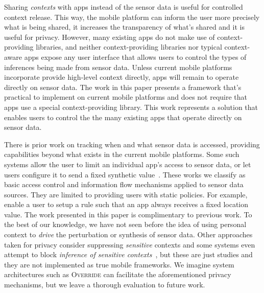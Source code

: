 \documentclass[10pt]{sensys-proc}
\begin{document}
Sharing \emph{contexts} with apps instead of the sensor data is useful for controlled context release. This way, the mobile platform can inform the user more precisely what is being shared, it increases the transparency of what's shared and it is useful for privacy. However, many existing apps do not make use of context-providing libraries, and neither context-providing libraries nor typical context-aware apps expose any user interface that allows users to control the types of inferences being made from sensor data. Unless current mobile platforms incorporate provide high-level context directly, apps will remain to operate directly on sensor data. The work in this paper presents a framework that's practical to implement on current mobile platforms and does not require that apps use a special context-providing library. This work represents a solution that enables users to control the the many existing apps that operate directly on sensor data.

There is prior work on tracking when and what sensor data is accessed, providing capabilities beyond what exists in the current mobile platforms. Some such systems allow the user to limit an individual app's access to sensor data, or let users configure it to send a fixed synthetic value~\cite{Beresford:MockDroid,Enck:TaintDroid}. These works we classify as basic access control and information flow mechanisms applied to sensor data sources. They are limited to providing users with static policies. For example, \cite{Beresford:MockDroid} enable a user to setup a rule such that an app always receives a fixed location value. The work presented in this paper is complimentary to previous work. To the best of our knowledge, we have not seen before the idea of using personal context to \emph{drive} the perturbation or synthesis of sensor data. Other approaches taken for privacy consider suppressing \emph{sensitive} contexts and some systems even attempt to block \emph{inference of sensitive contexts}~\cite{Gotz:MaskIt}, but these are just studies and they are not implemented as true mobile frameworks. We imagine system architectures such as \textsc{Override} can facilitate the aforementioned privacy mechanisms, but we leave a thorough evaluation to future work.

\end{document}
